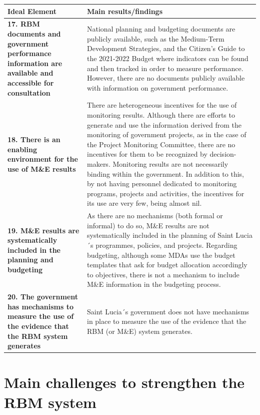 \documentclass[
  10pt,
]{book}
\begin{document}
\begingroup\fontsize{12}{14}\selectfont

\begin{tabu} to 
\hline
Ideal Element & Main results/findings\\
\hline
\textbf{17. RBM documents and government performance information are available and accessible for consultation} & National planning and budgeting documents are publicly available, such as the Medium-Term Development Strategies, and the Citizen's Guide to the 2021-2022 Budget where indicators can be found and then tracked in order to measure performance. However, there are no documents publicly available with information on government performance.\\
\hline
\textbf{18. There is an enabling environment for the use of M\&E results} & There are heterogeneous incentives for the use of monitoring results. Although there are efforts to generate and use the information derived from the monitoring of government projects, as in the case of the Project Monitoring Committee, there are no incentives for them to be recognized by decision-makers. Monitoring results are not necessarily binding within the government. In addition to this, by not having personnel dedicated to monitoring programs, projects and activities, the incentives for its use are very few, being almost nil.\\
\hline
\textbf{19. M\&E results are systematically included in the planning and budgeting} & As there are no mechanisms (both formal or informal) to do so, M\&E results are not systematically included in the planning of Saint Lucia´s programmes, policies, and projects. Regarding budgeting, although some MDAs use the budget templates that ask for budget allocation accordingly to objectives, there is not a mechanism to include M\&E information in the budgeting process.\\
\hline
\textbf{20. The government has mechanisms to measure the use of the evidence that the RBM system generates} & Saint Lucia´s government does not have mechanisms in place to measure the use of the evidence that the RBM (or M\&E) system generates.\\
\hline
\end{tabu}
\endgroup{}

\hypertarget{main-challenges-to-strengthen-the-rbm-system}{%
\section{Main challenges to strengthen the RBM system}\label{main-challenges-to-strengthen-the-rbm-system}}
\end{document}
